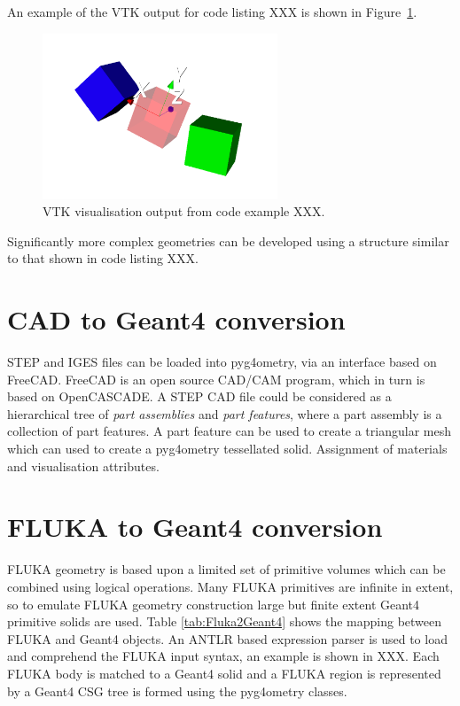 \documentclass[final,5p,times,twocolumn]{elsarticle}
\begin{document}
An example of the VTK output for code listing XXX is shown in Figure~\ref{fig:rapidModellingExample}.
\begin{figure}[htbp]
\begin{center}
\includegraphics[width=7cm]{./diagrams/rapidModelling.pdf}
\caption{VTK visualisation output from code example XXX.}
\label{fig:rapidModellingExample}
\end{center}
\end{figure}
Significantly more complex geometries can be developed using a structure similar to that shown in code listing XXX.  

\section{CAD to Geant4 conversion }
STEP and IGES files can be loaded into pyg4ometry, via an interface based on FreeCAD. FreeCAD is an open source CAD/CAM program, which in turn 
is based on OpenCASCADE. A STEP CAD file could be considered as a hierarchical tree of {\it part assemblies} and {\it part features}, where a part assembly is a 
collection of part features. A part feature can be used to create  a triangular mesh which can used to create a pyg4ometry tessellated solid. Assignment of materials 
and visualisation attributes. 

\section{FLUKA to Geant4 conversion}
FLUKA geometry is based upon a limited set of primitive volumes which can be combined using logical operations. Many FLUKA primitives are infinite in extent, so 
to emulate FLUKA geometry construction large but finite extent Geant4 primitive solids are used. Table \ref{tab:Fluka2Geant4} shows the mapping between FLUKA and Geant4 objects.
An ANTLR based expression parser is used to load and comprehend the FLUKA input syntax, an example is shown in XXX. Each FLUKA body is matched to a Geant4 
solid and a FLUKA region is represented by a Geant4 CSG tree is formed using the pyg4ometry classes. 
\end{document}
